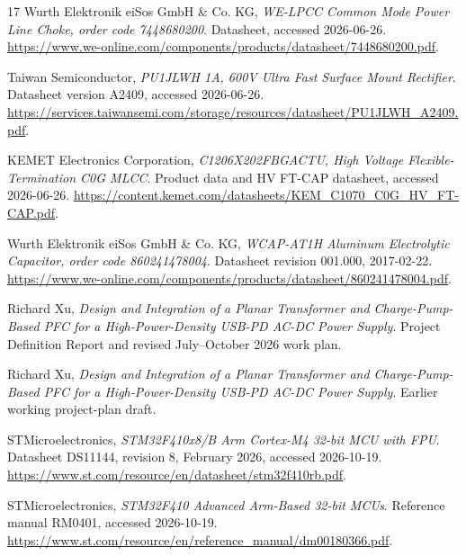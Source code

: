\begin{thebibliography}{17}
Wurth Elektronik eiSos GmbH \& Co. KG,
\emph{WE-LPCC Common Mode Power Line Choke, order code 7448680200}.
Datasheet, accessed 2026-06-26.
\url{https://www.we-online.com/components/products/datasheet/7448680200.pdf}.

Taiwan Semiconductor,
\emph{PU1JLWH 1A, 600V Ultra Fast Surface Mount Rectifier}.
Datasheet version A2409, accessed 2026-06-26.
\url{https://services.taiwansemi.com/storage/resources/datasheet/PU1JLWH_A2409.pdf}.

KEMET Electronics Corporation,
\emph{C1206X202FBGACTU, High Voltage Flexible-Termination C0G MLCC}.
Product data and HV FT-CAP datasheet, accessed 2026-06-26.
\url{https://content.kemet.com/datasheets/KEM_C1070_C0G_HV_FT-CAP.pdf}.

Wurth Elektronik eiSos GmbH \& Co. KG,
\emph{WCAP-AT1H Aluminum Electrolytic Capacitor, order code 860241478004}.
Datasheet revision 001.000, 2017-02-22.
\url{https://www.we-online.com/components/products/datasheet/860241478004.pdf}.

Richard Xu,
\emph{Design and Integration of a Planar Transformer and Charge-Pump-Based PFC for a High-Power-Density USB-PD AC-DC Power Supply}.
Project Definition Report and revised July--October 2026 work plan.


Richard Xu,
\emph{Design and Integration of a Planar Transformer and Charge-Pump-Based PFC for a High-Power-Density USB-PD AC-DC Power Supply}.
Earlier working project-plan draft.

STMicroelectronics,
\emph{STM32F410x8/B Arm Cortex-M4 32-bit MCU with FPU}.
Datasheet DS11144, revision 8, February 2026, accessed 2026-10-19.
\url{https://www.st.com/resource/en/datasheet/stm32f410rb.pdf}.

STMicroelectronics,
\emph{STM32F410 Advanced Arm-Based 32-bit MCUs}.
Reference manual RM0401, accessed 2026-10-19.
\url{https://www.st.com/resource/en/reference_manual/dm00180366.pdf}.

\end{thebibliography}
